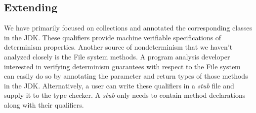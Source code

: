 \subsection{Extending \ourTypeSystem}\label{extending-det-checker}
We have primarily focused on collections and annotated the corresponding classes in the JDK.
These qualifiers provide machine verifiable specifications of determinism properties.
Another source of nondeterminism that we haven't analyzed closely is the File system methods.
A program analysis developer interested in verifying determinism guarantees with respect to 
the File system can easily do so by annotating the parameter and return types of those methods in the JDK.
Alternatively, a user can write these qualifiers in a \textit{stub} file and supply it to the type checker. A \textit{stub}
only needs to contain method declarations along with their qualifiers.

